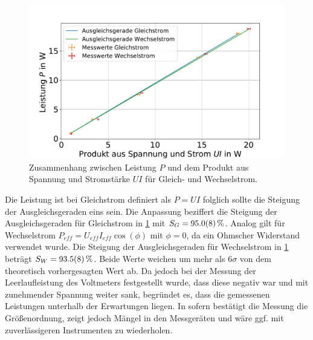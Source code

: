 \FloatBarrier




\begin{figure}[h]
	\centering
	\includegraphics[width=0.9\linewidth]{"auswertung/Auswertung Innenwiderstand/Leistung 2"}
	\caption{Zusammenhang zwischen Leistung $P$ und dem Produkt aus Spannung und Stromstärke $UI$ für Gleich- und Wechselstrom.}
	\label{fig:leistung-r2}
\end{figure}




Die Leistung ist bei Gleichstrom definiert als $P=UI$ folglich sollte die Steigung der Ausgleichsgeraden eins sein. Die Anpassung beziffert die Steigung der Ausgleichsgeraden für Gleichstrom in \cref{fig:leistung-r2} mit $S_{G}=\SI{ 95.0+-0.8}{\percent}$. Analog gilt für Wechselstrom $P_{eff}=U_{eff}  I_{eff} \cos(\phi)$ mit $\phi=0$, da ein Ohmscher Widerstand verwendet wurde. Die Steigung der Ausgleichsgeraden für Wechselstrom in \cref{fig:leistung-r2} beträgt $S_W=\SI{93.5+-0.8}{\percent}$. Beide Werte weichen um mehr als $6\sigma$ von dem theoretisch vorhergesagten Wert ab. Da jedoch bei der Messung der Leerlaufleistung des Voltmeters festgestellt wurde, dass diese negativ war und mit zunehmender Spannung weiter sank, begründet es, dass die gemessenen Leistungen unterhalb der Erwartungen liegen. In sofern bestätigt die Messung die Größenordnung, zeigt jedoch Mängel in den Messgeräten und wäre ggf. mit zuverlässigeren Instrumenten zu wiederholen.














